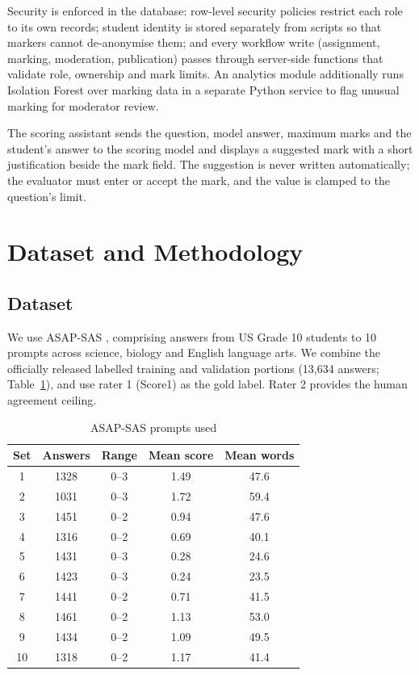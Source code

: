\documentclass[conference]{IEEEtran}
\begin{document}
Security is enforced in the database: row-level security policies restrict each role to its own records; student identity is stored separately from scripts so that markers cannot de-anonymise them; and every workflow write (assignment, marking, moderation, publication) passes through server-side functions that validate role, ownership and mark limits. An analytics module additionally runs Isolation Forest \cite{liu2008} over marking data in a separate Python service to flag unusual marking for moderator review.

The scoring assistant sends the question, model answer, maximum marks and the student's answer to the scoring model and displays a suggested mark with a short justification beside the mark field. The suggestion is never written automatically; the evaluator must enter or accept the mark, and the value is clamped to the question's limit.

\section{Dataset and Methodology}
\subsection{Dataset}
We use ASAP-SAS \cite{shermis2014}, comprising answers from US Grade 10 students to 10 prompts across science, biology and English language arts. We combine the officially released labelled training and validation portions (13,634 answers; Table~\ref{tab:data}), and use rater 1 (Score1) as the gold label. Rater 2 provides the human agreement ceiling.

\begin{table}[t]\centering\caption{ASAP-SAS prompts used}\label{tab:data}
\begin{tabular}{ccccc}\toprule
Set & Answers & Range & Mean score & Mean words \\\midrule
1 & 1328 & 0--3 & 1.49 & 47.6 \\
2 & 1031 & 0--3 & 1.72 & 59.4 \\
3 & 1451 & 0--2 & 0.94 & 47.6 \\
4 & 1316 & 0--2 & 0.69 & 40.1 \\
5 & 1431 & 0--3 & 0.28 & 24.6 \\
6 & 1423 & 0--3 & 0.24 & 23.5 \\
7 & 1441 & 0--2 & 0.71 & 41.5 \\
8 & 1461 & 0--2 & 1.13 & 53.0 \\
9 & 1434 & 0--2 & 1.09 & 49.5 \\
10 & 1318 & 0--2 & 1.17 & 41.4 \\
\bottomrule\end{tabular}\end{table}
\end{document}

